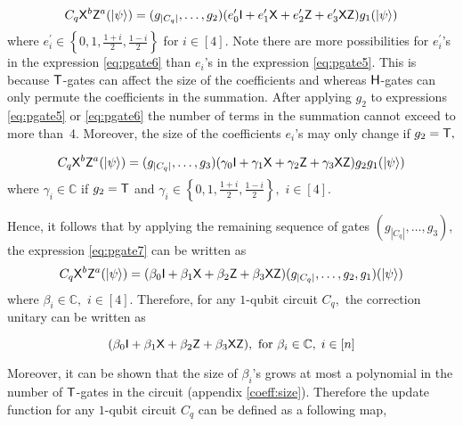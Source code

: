 \begin{equation}
\begin{aligned}
\label{eq:pgate6}
C_q {\sf X}^b{\sf Z}^a ({\lvert}\psi\rangle)=(g_{|C_q|},\ldots,g_2)(e_0^\prime {\sf I} +  e_1^\prime {\sf X} + e_2^\prime {\sf Z} + e_3^\prime {\sf X} {\sf Z})g_1 ({\lvert}\psi\rangle)
\end{aligned}
\end{equation}
where $e_i^\prime \in\left\{0,1, \frac{1+i}{2}, \frac{1-i}{2}\right\}$  for $i\in[4].$ Note there are more possibilities for $e_i^\prime$'s in the expression \ref{eq:pgate6} than $e_i$'s in the expression \ref{eq:pgate5}. This is because ${\sf T}$-gates can affect the size of the coefficients and whereas ${\sf H}$-gates can only permute the coefficients in the summation. After applying $g_2$ to expressions \ref{eq:pgate5} or \ref{eq:pgate6} the number of terms in the summation cannot exceed to more than~4. Moreover, the size of the coefficients $e_i$'s may only change if $g_2={\sf T},$

\begin{equation}
\begin{aligned}
\label{eq:pgate7}
C_q {\sf X}^b{\sf Z}^a ({\lvert}\psi\rangle)=(g_{|C_q|},\ldots,g_3)(\gamma_0 {\sf I} +  \gamma_1 {\sf X} + \gamma_2 {\sf Z} + \gamma_3 {\sf X} {\sf Z})g_2g_1 ({\lvert}\psi\rangle)
\end{aligned}
\end{equation}
where $\gamma_i \in \mathbb{C}$ if $g_2={\sf T}$ and $\gamma_i  \in\left\{0,1, \frac{1+i}{2}, \frac{1-i}{2}\right\},$  $i\in[4].$

Hence, it follows  that by applying the remaining  sequence of gates $(g_{|C_q|},\ldots,g_3)$, the expression \ref{eq:pgate7} can be written as
\begin{equation}
\begin{aligned}
\label{eq:pgate8}
C_q {\sf X}^b{\sf Z}^a ({\lvert}\psi\rangle)=(\beta_0 {\sf I} +  \beta_1 {\sf X} + \beta_2 {\sf Z} + \beta_3{\sf X} {\sf Z})(g_{|C_q|},\ldots,g_2,g_1 )({\lvert}\psi\rangle)
\end{aligned}
\end{equation}
where $\beta_i  \in \mathbb{C},$ $i\in[4].$  Therefore, for any  $1$-qubit circuit $C_q,$ the correction unitary can be written as

\begin{equation}
\label{eq:pgate9}
 (\beta_0 {\sf I} +   \beta_1 {\sf X} +  \beta_2 {\sf Z} +  \beta_3 {\sf X}{\sf Z}), \mbox{ for }  \beta_i \in \mathbb{C},\; i\in[n]
\end{equation}

Moreover, it can be shown that the size of $\beta_i$'s grows at most a polynomial in the number of ${\sf T}$-gates in the circuit (appendix \ref{coeff:size}). Therefore the update function for any $1$-qubit circuit $C_q$ can be defined as a following map,

